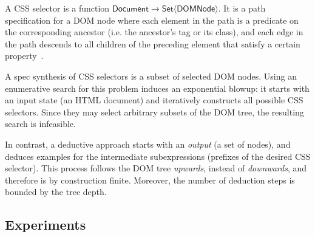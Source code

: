\begin{scenario}
    A CSS selector is a function $\mathsf{Document} \to \mathsf{Set}\langle \mathsf{DOMNode}\rangle$.
    It is a path specification for a DOM node where each element in the path is a predicate on the corresponding
    ancestor (i.e.  the ancestor's tag or its class), and each edge in the path descends to all children of the
    preceding element that satisfy a certain property~\cite{css3selectors}.

    A spec synthesis of CSS selectors is a subset of selected DOM nodes.
    Using an enumerative search for this problem induces an exponential blowup: it starts with an input state (an HTML
    document) and iteratively constructs all possible CSS selectors.
    Since they may select arbitrary subsets of the DOM tree, the resulting search is infeasible.

    In contrast, a deductive approach starts with an \emph{output} (a set of nodes), and deduces examples for the
    intermediate subexpressions (prefixes of the desired CSS selector).
    This process follows the DOM tree \emph{upwards}, instead of \emph{downwards}, and therefore is by construction
    finite.
    Moreover, the number of deduction steps is bounded by the tree depth.
\end{scenario}

\subsection{Experiments}
\label{sec:prose:evaluation:experiments}

